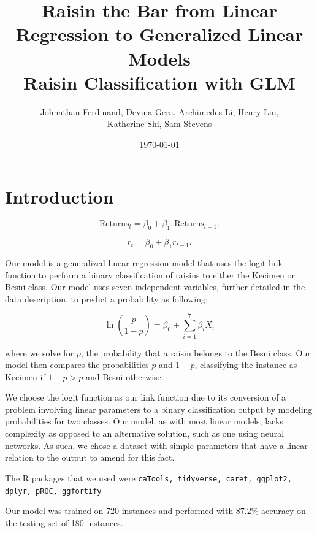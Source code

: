 \documentclass{article}
\title {Raisin the Bar from Linear Regression to Generalized Linear Models \\[1ex] \large Raisin Classification with GLM}
\author{Johnathan Ferdinand, Devina Gera, Archimedes Li, Henry Liu, \\Katherine Shi, Sam Stevens}
\date{\today}
\begin{document}
\maketitle

\section{Introduction}

\[
\text{Returns}_t = \beta_0 + \beta_1,\text{Returns}_{t-1}.
\]

\[
r_t = \beta_0 + \beta_1r_{t-1}.
\]

Our model is a generalized linear regression model that uses the logit link function to perform a binary classification of raisins to either the Kecimen or Besni class. Our model uses seven independent variables, further detailed in the data description, to predict a probability as following:

$$\ln \left( \frac{p}{1-p}\right) = \beta_0 + \sum_{i=1}^{7} \beta_i X_i$$

where we solve for $p$, the probability that a raisin belongs to the Besni class. Our model then compares the probabilities $p$ and $1-p$, classifying the instance as Kecimen if $1-p > p$ and Besni otherwise.

We choose the logit function as our link function due to its conversion of a problem involving linear parameters to a binary classification output by modeling probabilities for two classes. Our model, as with most linear models, lacks complexity as opposed to an alternative solution, such as one using neural networks. As such, we chose a dataset with simple parameters that have a linear relation to the output to amend for this fact.

The R packages that we used were \texttt{caTools, tidyverse, caret, ggplot2, dplyr, pROC, ggfortify}

Our model was trained on 720 instances and performed with $87.2\%$ accuracy on the testing set of 180 instances.
\end{document}
